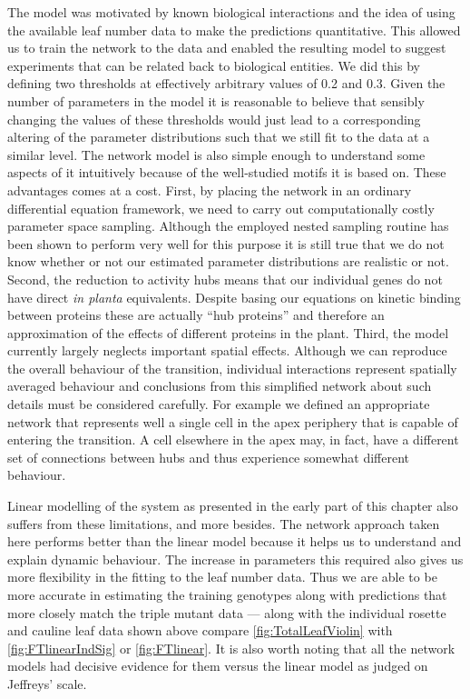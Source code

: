 The model was motivated by known biological interactions and the idea of using the available leaf number data to make the predictions quantitative.
This allowed us to train the network to the data and enabled the resulting model to suggest experiments that can be related back to biological entities.
We did this by defining two thresholds at effectively arbitrary values of 0.2 and 0.3.
Given the number of parameters in the model it is reasonable to believe that sensibly changing the values of these thresholds would just lead to a corresponding altering of the parameter distributions such that we still fit to the data at a similar level.
The network model is also simple enough to understand some aspects of it intuitively because of the well-studied motifs it is based on.
These advantages comes at a cost.
First, by placing the network in an ordinary differential equation framework, we need to carry out computationally costly parameter space sampling.
Although the employed nested sampling routine has been shown to perform very well for this purpose it is still true that we do not know whether or not our estimated parameter distributions are realistic or not.
Second, the reduction to activity hubs means that our individual genes do not have direct \emph{in planta} equivalents.
Despite basing our equations on kinetic binding between proteins these are actually ``hub proteins'' and therefore an approximation of the effects of different proteins in the plant.
Third, the model currently largely neglects important spatial effects.
Although we can reproduce the overall behaviour of the transition, individual interactions represent spatially averaged behaviour and conclusions from this simplified network about such details must be considered carefully.
For example we defined an appropriate network that represents well a single cell in the apex periphery that is capable of entering the transition.
A cell elsewhere in the apex may, in fact, have a different set of connections between hubs and thus experience somewhat different behaviour.

Linear modelling of the system as presented in the early part of this chapter also suffers from these limitations, and more besides.
The network approach taken here performs better than the linear model because it helps us to understand and explain dynamic behaviour.
The increase in parameters this required also gives us more flexibility in the fitting to the leaf number data.
Thus we are able to be more accurate in estimating the training genotypes along with predictions that more closely match the triple mutant data --- along with the individual rosette and cauline leaf data shown above compare \autoref{fig:TotalLeafViolin} with \autoref{fig:FTlinearIndSig} or \autoref{fig:FTlinear}.
It is also worth noting that all the network models had decisive evidence for them versus the linear model as judged on Jeffreys' scale.

